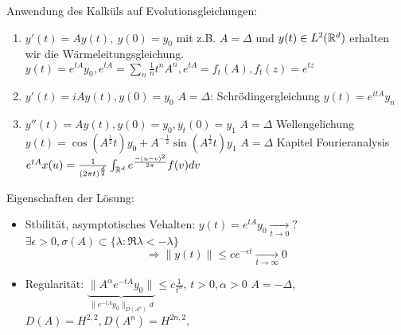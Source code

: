  Anwendung des Kalküls auf Evolutionsgleichungen:
 \begin{enumerate}[label=\roman*\upshape)]
 	\item  $y'(t) = A y(t), ~ y(0) = y_{0} $
 		mit z.B. $A = \Delta$ und $y (t) \in L^{2}(\mathbb{R}^{d})$ erhalten wir die Wärmeleitungsgleichung.
		$y(t) = e^{tA} y_{0}, e^{t A} = \sum_{n} \frac{1}{n} t^{n} A^{n}, e^{tA} = f_{t}(A), f_{t}(z) = e^{tz}$ 
	\item $y'(t) = i A y(t), y(0) = y_{0}$ 
		$A = \Delta$: Schrödingergleichung
		$y(t) = e^{i t A} y_{n}$
	\item $y''(t) = A y(t), y(0) = y_{0}, y_{t}(0) = y_{1}$
		$A = \Delta$ Wellengelichung
		$y(t) = \cos(A^{\frac{1}{2}}t) y_{0} + A^{-\frac{1}{2}} \sin(A^{\frac{1}{2}} t) y_{1}$
		$A = \Delta$ Kapitel Fourieranalysis
		$e^{tA}x(u) = \frac{1}{(2 \pi t)^{\frac{d}{2}}} \int_{\mathbb{R}^{d}} e^{\frac{-(u - v)^{2}}{2 \pi}} f(v) dv$
 \end{enumerate}
Eigenschaften der Lösung:
\begin{itemize}
	\item Stbilität, asymptotisches Vehalten:
		$y(t) = e^{t A}y_{0} \xrightarrow[t \rightarrow 0]{} ?$
		$\exists \epsilon > 0, \sigma(A) \subset \{ \lambda : \Re \lambda < - \lambda \}$
		\[ \Rightarrow \| y(t) \| \leq c e^{- \epsilon t} \xrightarrow[t \rightarrow \infty]{} 0 \]
	\item Regularität:
		$\underbrace{\| A^{\alpha} e^{- t A} y_{0} \|}_{\| e^{-tA} y_{0} \|_{D(A^{\alpha})} d} \leq c \frac{1}{t^{\alpha}}$, $t > 0, \alpha > 0$
		$A = - \Delta$, $D(A) = H^{2, 2}, D(A^{n}) = H^{2n, 2},$
\end{itemize}
 
 
\newpage